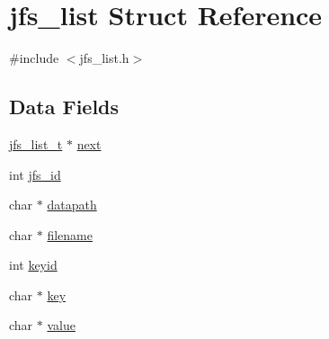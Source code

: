 \hypertarget{structjfs__list}{
\section{jfs\_\-list Struct Reference}
\label{structjfs__list}
}


{\ttfamily \#include $<$jfs\_\-list.h$>$}

\subsection*{Data Fields}
\begin{DoxyCompactItemize}
\item 
\hyperlink{structjfs__list}{jfs\_\-list\_\-t} $\ast$ \hyperlink{structjfs__list_a1b1015db06a0db093f83e1c244656f1e}{next}
\item 
int \hyperlink{structjfs__list_a6c7a0a4d0548db9b729250f748b5b841}{jfs\_\-id}
\item 
char $\ast$ \hyperlink{structjfs__list_adeccef2df53d28dd90702c6674525e09}{datapath}
\item 
char $\ast$ \hyperlink{structjfs__list_a882b82a5f8c9d48c0611dee9d928a99b}{filename}
\item 
int \hyperlink{structjfs__list_a51e9e04713c871745dbebc574faf63d7}{keyid}
\item 
char $\ast$ \hyperlink{structjfs__list_a5fef51520e92005733aa1128e0f67ab1}{key}
\item 
char $\ast$ \hyperlink{structjfs__list_ae71210d9568ffcd012595f41e2b61db9}{value}
\end{DoxyCompactItemize}


